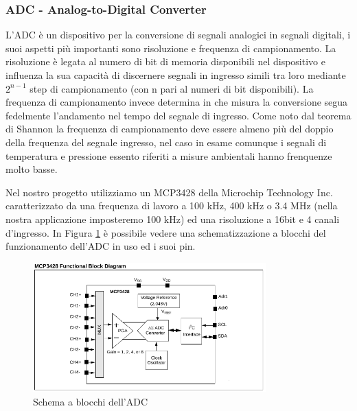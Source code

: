 \documentclass[10pt]{article}
\begin{document}
		\subsubsection{ADC - Analog-to-Digital Converter}\label{sec:adc}
		L'ADC è un dispositivo per la conversione di segnali analogici in segnali digitali, i suoi aspetti più importanti sono risoluzione e frequenza di campionamento.
		La risoluzione è legata al numero di bit di memoria disponibili nel dispositivo e influenza la sua capacità di discernere segnali in ingresso simili tra loro mediante $2^{n-1}$ step di campionamento (con n pari al numeri di bit disponibili). La frequenza di campionamento invece determina in che misura la conversione segua fedelmente l'andamento nel tempo del segnale di ingresso. Come noto dal teorema di Shannon la frequenza di campionamento deve essere almeno più del doppio della frequenza del segnale ingresso, nel caso in esame comunque i segnali di temperatura e pressione essento riferiti a misure ambientali hanno frenquenze molto basse.

		Nel nostro progetto utilizziamo un MCP3428 della Microchip Technology Inc. caratterizzato da una frequenza di lavoro a 100 kHz, 400 kHz o 3.4 MHz (nella nostra applicazione imposteremo 100 kHz) ed una risoluzione a 16bit e 4 canali d'ingresso. In Figura \ref{fig:adc} è possibile vedere una schematizzazione a blocchi del funzionamento dell'ADC in uso ed i suoi pin.
		\begin{figure}[h]
			\centering
			\includegraphics[width=0.8\textwidth]{src/adc_block}
			\caption{Schema a blocchi dell'ADC}\label{fig:adc}
		\end{figure}
		
\end{document}
